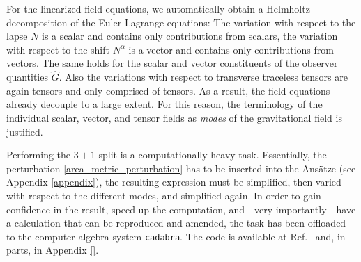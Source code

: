 For the linearized field equations, we automatically obtain a Helmholtz decomposition of the Euler-Lagrange equations: The variation with respect to the lapse $N$ is a scalar and contains only contributions from scalars, the variation with respect to the shift $N^\alpha$ is a vector and contains only contributions from vectors. The same holds for the scalar and vector constituents of the observer quantities $\hat G$. Also the variations with respect to transverse traceless tensors are again tensors and only comprised of tensors. As a result, the field equations already decouple to a large extent. For this reason, the terminology of the individual scalar, vector, and tensor fields as \emph{modes} of the gravitational field is justified.

Performing the $3+1$ split is a computationally heavy task. Essentially, the perturbation \eqref{area_metric_perturbation} has to be inserted into the Ansätze (see Appendix \ref{appendix}), the resulting expression must be simplified, then varied with respect to the different modes, and simplified again. In order to gain confidence in the result, speed up the computation, and---very importantly---have a calculation that can be reproduced and amended, the task has been offloaded to the computer algebra system \texttt{cadabra}\cite{cadabra}. The code is available at Ref.~\cite{area_metric_gravity_code} and, in parts, in Appendix \ref{}.

